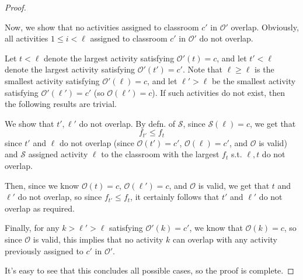 \documentclass{article}
\theoremstyle{plain}%
\theoremstyle{definition}
\theoremstyle{remark}
\begin{document}
\begin{proof}
\begin{itemize}
            Now, we show that no activities assigned to classroom $c'$
                in $\mathcal{O}'$ overlap.
            Obviously, all activities $1 \le i < \ell$ assigned to classroom
                $c'$ in $\mathcal{O}'$ do not overlap.

            Let $t < \ell$ denote the largest activity satisfying 
                $\mathcal{O}'(t) = c$,
                and let $t' < \ell$ denote the largest activity satisfying
                $\mathcal{O}'(t') = c'$.
            Note that $\ell \ge \ell$ is the smallest activity satisfying
                $\mathcal{O}'(\ell) = c$,
                and let $\ell' > \ell$ be the smallest activity satisfying
                $\mathcal{O}'(\ell') = c'$ (so $ \mathcal{O}(\ell') = c$).
            If such activities do not exist, then the following results
                are trivial.

            We show that $t',\ell'$ do not overlap.
            By defn. of $\mathcal{S}$, since $\mathcal{S}(\ell) = c$,
                we get that
            \begin{equation}
                f_{t'} \le f_{t}
            \end{equation}
                since
                    $t'$ and $\ell$ do not overlap (since $\mathcal{O}(t') = c'$, $\mathcal{O}(\ell) = c'$, and $\mathcal{O}$ is valid)
                    and $\mathcal{S}$ assigned activity $\ell$ to the classroom 
                    with the largest $f_t$ s.t. $\ell,t$ do not overlap.

            Then, since we know $\mathcal{O}(t) = c$, $\mathcal{O}(\ell') = c$, and $\mathcal{O}$
                is valid, we get that $t$ and $\ell'$ do not overlap,
                    so since $f_{t'} \le f_{t}$, it certainly follows that
                        $t'$ and $\ell'$ do not overlap as required.

            Finally, for any $k > \ell' > \ell$ satisfying $\mathcal{O}'(k) = c'$,
                we know that $\mathcal{O}(k) = c$, so since $\mathcal{O}$ is
                valid, this implies that no activity $k$ can overlap with any
                activity previously assigned to $c'$ in $\mathcal{O}'$.

    \end{itemize} 
    It's easy to see that this concludes all possible cases, so the proof is complete.


\end{proof}
\end{document}
